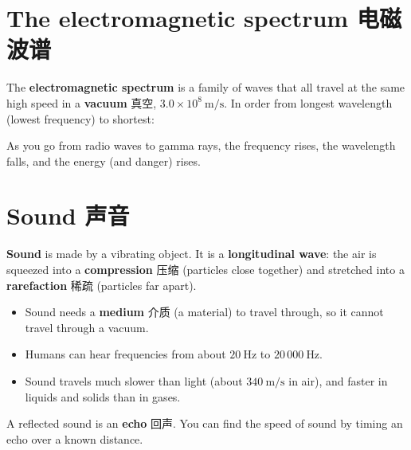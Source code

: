 \documentclass[11pt]{article}
\begin{document}
\section*{The electromagnetic spectrum 电磁波谱}

The \textbf{electromagnetic spectrum} is a family of waves that all travel at the same high speed in a \textbf{vacuum} 真空, $3.0 \times 10^8\ \text{m/s}$. In order from longest wavelength (lowest frequency) to shortest:

\begin{center}
\end{center}

As you go from radio waves to gamma rays, the frequency rises, the wavelength falls, and the energy (and danger) rises.

\section*{Sound 声音}

\textbf{Sound} is made by a vibrating object. It is a \textbf{longitudinal wave}: the air is squeezed into a \textbf{compression} 压缩 (particles close together) and stretched into a \textbf{rarefaction} 稀疏 (particles far apart).

\begin{itemize}
\item Sound needs a \textbf{medium} 介质 (a material) to travel through, so it cannot travel through a vacuum.

\item Humans can hear frequencies from about $20\ \text{Hz}$ to $20\,000\ \text{Hz}$.

\item Sound travels much slower than light (about $340\ \text{m/s}$ in air), and faster in liquids and solids than in gases.

\end{itemize}

A reflected sound is an \textbf{echo} 回声. You can find the speed of sound by timing an echo over a known distance.
\end{document}
